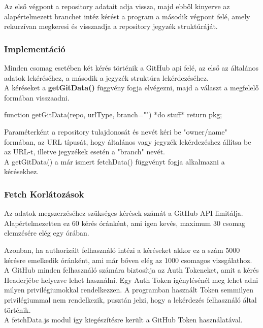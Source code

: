 Az első végpont a repository adatait adja vissza, majd ebből kinyerve az alapértelmezett branchet intéz kérést a program a második végpont felé, amely rekurzívan megkeresi és visszaadja a repository jegyzék struktúráját.

\subsubsection{Implementáció}
Minden csomag esetében két kérés történik a GitHub api felé, az első az általános adatok lekéréséhez, a második a jegyzék struktúra lekérdezéséhez.\\

A kéréseket a \textbf{getGitData()} függvény fogja elvégezni, majd a választ a megfelelő formában visszaadni.

\begin{js}
	function getGitData(repo, urlType, branch=""){  
		*do stuff*
		return pkg;
	}
\end{js}
Paraméterként a repository tulajdonosát és nevét kéri be "owner/name" formában, az URL típusát, hogy általános vagy jegyzék lekérdezéshez állítsa be az URL-t, illetve jegyzékek esetén a "branch" nevét.\\

A getGitData() a már ismert fetchData() függvényt fogja alkalmazni a kérésekhez.

\subsubsection{Fetch Korlátozások}
Az adatok megszerzéséhez szükséges kérések számát a GitHub API limitálja. Alapértelmezetten ez 60 kérés óránként, ami igen kevés, maximum 30 csomag elemzésére elég egy órában.

Azonban, ha authorizált felhasználó intézi a kéréseket akkor ez a szám 5000 kérésre emelkedik óránként, ami már bőven elég az 1000 csomagos vizsgálathoz.\\

A GitHub minden felhasználó számára biztosítja az Auth Tokeneket, amit a kérés Headerjébe helyezve lehet használni. Egy Auth Token igénylésénél meg lehet adni milyen privilégiumokkal rendelkezzen. A programban használt Token semmilyen privilégiummal nem rendelkezik, pusztán jelzi, hogy a lekérdezés felhasználó által történik.\\

A fetchData.js modul így kiegészítésre került a GitHub Token használatával.

\pagebreak

